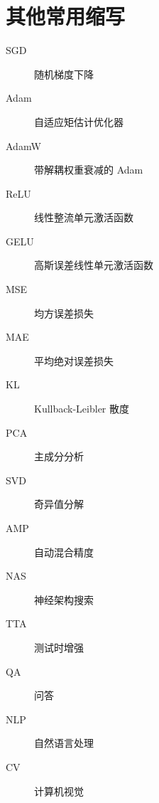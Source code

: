 \section{其他常用缩写}

\begin{description}
    \item[SGD] 随机梯度下降
    \item[Adam] 自适应矩估计优化器
    \item[AdamW] 带解耦权重衰减的 Adam
    \item[ReLU] 线性整流单元激活函数
    \item[GELU] 高斯误差线性单元激活函数
    \item[MSE] 均方误差损失
    \item[MAE] 平均绝对误差损失
    \item[KL] Kullback-Leibler 散度
    \item[PCA] 主成分分析
    \item[SVD] 奇异值分解
    \item[AMP] 自动混合精度
    \item[NAS] 神经架构搜索
    \item[TTA] 测试时增强
    \item[QA] 问答
    \item[NLP] 自然语言处理
    \item[CV] 计算机视觉
\end{description}
